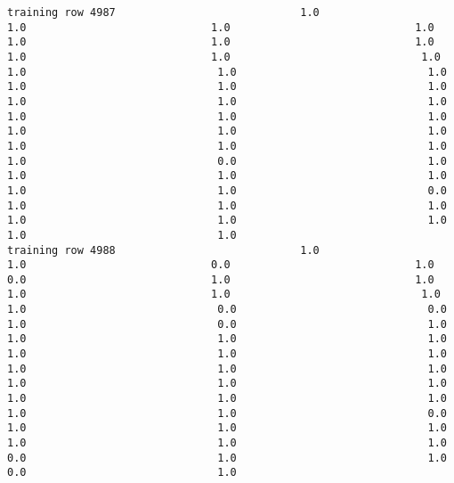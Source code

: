 \documentclass[11pt]{article}
\begin{document}
\begin{verbatim}
training row 4987                             1.0                             1.0                             1.0                             1.0                             1.0                             1.0                             1.0                             1.0                             1.0                              1.0                              1.0                              1.0                              1.0                              1.0                              1.0                              1.0                              1.0                              1.0                              1.0                              1.0                              1.0                              1.0                              1.0                              1.0                              1.0                              1.0                              1.0                              1.0                              1.0                              0.0                              1.0                              1.0                              1.0                              1.0                              1.0                              1.0                              0.0                              1.0                              1.0                              1.0                              1.0                              1.0                              1.0                              1.0                              1.0
training row 4988                             1.0                             1.0                             0.0                             1.0                             0.0                             1.0                             1.0                             1.0                             1.0                              1.0                              1.0                              0.0                              0.0                              1.0                              0.0                              1.0                              1.0                              1.0                              1.0                              1.0                              1.0                              1.0                              1.0                              1.0                              1.0                              1.0                              1.0                              1.0                              1.0                              1.0                              1.0                              1.0                              1.0                              0.0                              1.0                              1.0                              1.0                              1.0                              1.0                              1.0                              0.0                              1.0                              1.0                              0.0                              1.0

\end{verbatim}
\end{document}
